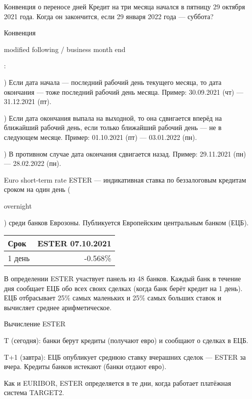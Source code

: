 \documentclass{beamer}
\newcommand{\en}[1]{\begin{otherlanguage}{english}#1\end{otherlanguage}}
\begin{document}
\begin{frame}{Конвенция о переносе дней}
\justify
Кредит на три месяца начался в пятницу 29 октября 2021 года. Когда он закончится, если 29 января 2022 года --- суббота?

\justify
Конвенция \en{modified following / business month end}:

) Если дата начала --- последний рабочий день текущего месяца, то дата окончания --- тоже последний рабочий день месяца. Пример: 30.09.2021 (чт) --- 31.12.2021 (пт).

) Если дата окончания выпала на выходной, то она сдвигается вперёд на ближайший рабочий день, если только ближайший рабочий день --- не в следующем месяце. Пример: 01.10.2021 (пт) --- 03.01.2022 (пн).

) В противном случае дата окончания сдвигается назад. Пример: 29.11.2021 (пн) --- 28.02.2022 (пн).
\end{frame}



\begin{frame}{Euro short-term rate}
\justify
\alert{ESTER} --- индикативная ставка по беззалоговым кредитам сроком на один день (\en{overnight}) среди банков Еврозоны. Публикуется Европейским центральным банком (ЕЦБ).

\justify
\centering
\begin{tabular}{l|r}
Срок   & ESTER 07.10.2021 \\ \hline
1 день & -0.568\%
\end{tabular}

\justify
В определении ESTER участвует панель из 48 банков. Каждый банк в течение дня сообщает ЕЦБ обо всех своих сделках (когда банк берёт кредит на 1 день). ЕЦБ отбрасывает 25\% самых маленьких и 25\% самых больших ставок и вычисляет среднее арифметическое.
\end{frame}



\begin{frame}{Вычисление ESTER}
\justify
\centering
{}

\justify
T (сегодня): банки берут кредиты (получают евро) и сообщают о сделках в ЕЦБ.

T+1 (завтра): ЕЦБ опубликует среднюю ставку вчерашних сделок --- ESTER за вчера. Кредиты банков истекают (банки отдают евро).

\justify
Как и EURIBOR, ESTER определяется в те дни, когда работает платёжная система TARGET2.
\end{frame}
\end{document}
